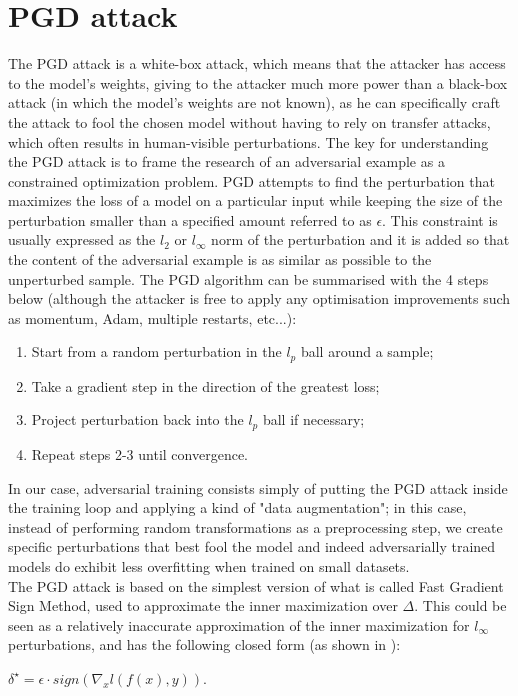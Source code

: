 \documentclass{article}
\begin{document}
\section{PGD attack}
The PGD attack is a white-box attack, which means that the attacker has access
to the model's weights, giving to the attacker much more power than a black-box
attack (in which the model's weights are not known), as he can specifically
craft the attack to fool the chosen model without having to rely on transfer
attacks, which often results in human-visible perturbations. The key for
understanding the PGD attack is to frame the research of an adversarial example as a
constrained optimization problem. PGD attempts to find the perturbation that
maximizes the loss of a model on a particular input while keeping the size of
the perturbation smaller than a specified amount referred to as $\epsilon$. This
constraint is usually expressed as the $l_2$ or $l_{\infty}$ norm of the
perturbation and it is added so that the content of the adversarial example is as similar as possible to the unperturbed sample. The PGD algorithm can be summarised with the 4
steps below (although the attacker is free to apply any optimisation
improvements such as momentum, Adam, multiple restarts, etc...):
\begin{enumerate}
	\item Start from a random perturbation in the $l_p$ ball around a sample;
	\item Take a gradient step in the direction of the greatest loss;
	\item Project perturbation back into the $l_p$ ball if necessary;
	\item Repeat steps 2-3 until convergence.
\end{enumerate}
In our case, adversarial training consists simply of putting the PGD attack
inside the training loop and applying a kind of "data augmentation"; in this case,
instead of performing random transformations as a preprocessing step, we create
specific perturbations that best fool the model and indeed adversarially trained
models do exhibit less overfitting when trained on small datasets.\\
The PGD attack is based on the simplest version of what is called Fast Gradient
Sign Method, used to approximate the inner maximization over $\Delta$. This could be
seen as a relatively inaccurate approximation of the inner maximization for
$l_{\infty}$ perturbations, and has the following closed form (as shown in
\cite{GoodfellowEtAl2014}):
\begin{center}
	$\delta^{\star} = \epsilon \cdot sign(\nabla_{x}l(f(x), y))$.
\end{center}
\end{document}
